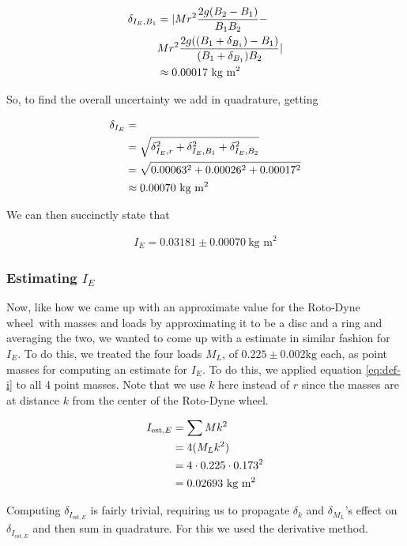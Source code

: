 \documentclass[coverpage]{article}
\newcommand{\iUnit}{\text{kg $\text{m}^2$}}
\newcommand{\rwheel}{Roto-Dyne wheel}
\begin{document}
	\begin{align}
		\delta_{I_E, B_1} &= |M r^2 \frac{2g(B_2 - B_1)}{B_1 B_2} - \notag \\
		&M r^2 \frac{2g((B_1 + \delta_{B_1}) - B_1)}{(B_1 + \delta_{B_1}) B_2}| \notag \\
		&\approx 0.00017\ \iUnit
	\end{align}

	So, to find the overall uncertainty we add in quadrature, getting
	
	\begin{align}
		\delta_{I_E} &= \\
		&= \sqrt{\delta_{I_E, r}^2 + \delta_{I_E, B_1}^2 + \delta_{I_E, B_2}^2} \notag \\
		&= \sqrt{0.00063^2 + 0.00026^2 + 0.00017^2} \notag \\
		&\approx 0.00070\ \iUnit
	\end{align}

	We can then succinctly state that
	
	\begin{align}
		I_E = 0.03181 \pm 0.00070\ \iUnit \label{eq:def-ie}
	\end{align}

	\subsubsection{Estimating $I_E$}
	
	Now, like how we came up with an approximate value for the \rwheel~with masses and loads by approximating it to be a disc and a ring and averaging the two, we wanted to come up with a estimate in similar fashion for $I_E$. To do this, we treated the four loads $M_L$, of $0.225 \pm 0.002 \text{kg}$ each, as point masses for computing an estimate for $I_E$. To do this, we applied equation \ref{eq:def-i} to all 4 point masses. Note that we use $k$ here instead of $r$ since the masses are at distance $k$ from the center of the \rwheel.
	
	\begin{align}
		I_{\text{est}, E} &= \sum{M k^2} \notag \\
		&= 4 (M_L k^2) \notag \\
		&= 4 \cdot 0.225 \cdot 0.173^2 \notag \\
		&= 0.02693\ \iUnit
	\end{align}
	
	Computing $\delta_{I_{\text{est}, E}}$ is fairly trivial, requiring us to propagate $\delta_k$ and $\delta_{M_L}$'s effect on $\delta_{I_{\text{est}, E}}$ and then sum in quadrature. For this we used the derivative method.
	
\end{document}
